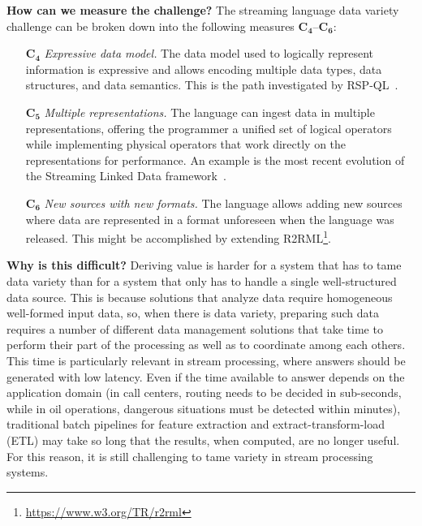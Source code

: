 \textbf{How can we measure the challenge?}
%
The streaming language data variety challenge can be broken down
into the following measures $\mathbf{C_4}$--$\mathbf{C_6}$:

\begin{itemize}[leftmargin=6mm]
  \item[$\mathbf{C_4}$] \emph{Expressive data model.}  The data model
    used to logically represent information is expressive and allows
    encoding multiple data types, data structures, and data
    semantics. This is the path investigated by
    RSP-QL~\cite{DellAglioDataScience2017,DBLP:conf/debs/ValleDM16}.
  \item[$\mathbf{C_5}$] \emph{Multiple representations.} The language
    can ingest data in multiple representations, offering the
    programmer a unified set of logical operators while implementing
    physical operators that work directly on the representations for
    performance. An example is the most recent evolution of the
    Streaming Linked Data framework~\cite{DBLP:conf/esws/BalduiniV017a}.
  \item[$\mathbf{C_6}$] \emph{New sources with new formats.} The
    language allows adding new sources where data are represented in a
    format unforeseen when the language was
    released. This might be accomplished by extending
    R2RML\footnote{\url{https://www.w3.org/TR/r2rml}}.
\end{itemize}

\textbf{Why is this difficult?}
%
Deriving value is harder for a system that has to tame data variety
than for a system that only has to handle a single well-structured
data source. This is because solutions that analyze data require
homogeneous well-formed input data, so, when there is data variety,
preparing such data requires a number of different data management solutions that take time to
perform their part of the processing as well as to coordinate among each others. This time is particularly relevant in stream
processing, where answers should be generated with low latency. Even
if the time available to answer depends on the application domain (in
call centers, routing needs to be decided in sub-seconds, while in oil
operations, dangerous situations must be detected within
minutes), traditional batch pipelines for feature extraction and
extract-transform-load (ETL) may take so long that the results, when
computed, are no longer useful. For this reason, it is still
challenging to tame variety in stream processing systems.
